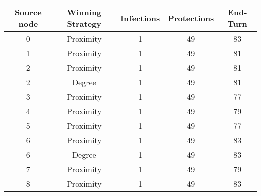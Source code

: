 \documentclass[results.tex]{subfiles}
\begin{document}
    \begin{center}
        \begin{tabular}{| c || c | c | c | c |}
            \hline
            {\bfseries Source node} & {\bfseries Winning Strategy} & {\bfseries Infections} & {\bfseries Protections}
            & {\bfseries End-Turn}
            \\  %
            \hline\hline
            0                       & Proximity                    & 1                      & 49                      & 83                   \\
            \hline
            1                       & Proximity                    & 1                      & 49                      & 81                   \\
            \hline
            2                       & Proximity                    & 1                      & 49                      & 81                   \\
            \hline
            2                       & Degree                       & 1                      & 49                      & 81                   \\
            \hline
            3                       & Proximity                    & 1                      & 49                      & 77                   \\
            \hline
            4                       & Proximity                    & 1                      & 49                      & 79                   \\
            \hline
            5                       & Proximity                    & 1                      & 49                      & 77                   \\
            \hline
            6                       & Proximity                    & 1                      & 49                      & 83                   \\
            \hline
            6                       & Degree                       & 1                      & 49                      & 83                   \\
            \hline
            7                       & Proximity                    & 1                      & 49                      & 79                   \\
            \hline
            8                       & Proximity                    & 1                      & 49                      & 83                   \\

\end{tabular}
\end{center}
\end{document}
